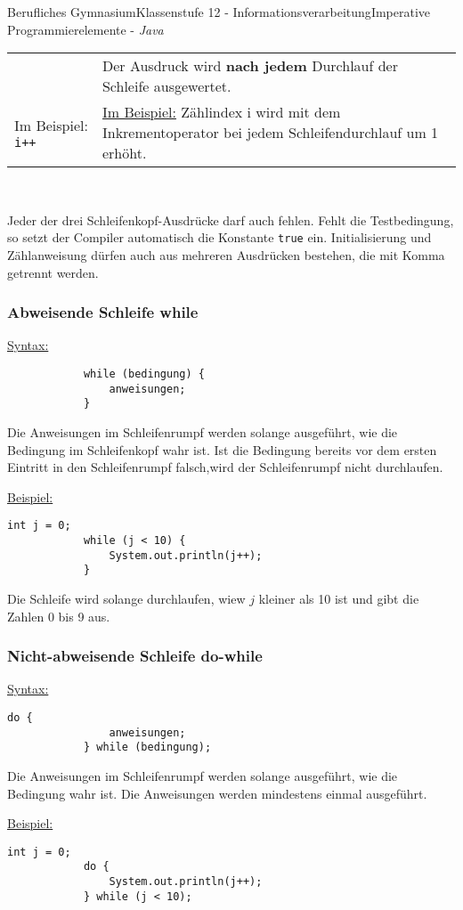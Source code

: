 \documentclass[oneside,openany,headings=optiontotoc,11pt,numbers=noenddot]{article}
\begin{document}
\begin{worksheet}{Berufliches Gymnasium}{Klassenstufe 12 - Informationsverarbeitung}{Imperative Programmierelemente - \textit{Java}}
\begin{tabularx}{\textwidth}{|l|X|}
			& Der Ausdruck wird \textbf{nach jedem} Durchlauf der Schleife ausgewertet.\\
			Im Beispiel: {\lstinline[style=JavaInputStyle]|i++|} & \underline{Im Beispiel:} Zählindex i wird mit dem Inkrementoperator bei jedem Schleifendurchlauf um 1 erhöht.\\
			\hline
		\end{tabularx}\\
		\par\noindent
		Jeder der drei Schleifenkopf-Ausdrücke darf auch fehlen. Fehlt die Testbedingung, so setzt der Compiler automatisch die Konstante \lstinline[style=JavaInputStyle]|true| ein. Initialisierung und Zählanweisung dürfen auch aus mehreren Ausdrücken bestehen, die mit Komma getrennt werden.
		\subsubsection{Abweisende Schleife while}
		\underline{Syntax:}
		\begin{lstlisting}
			while (bedingung) {
				anweisungen;
			}
		\end{lstlisting}
		Die Anweisungen im Schleifenrumpf werden solange ausgeführt, wie die Bedingung im Schleifenkopf wahr ist. Ist die Bedingung bereits vor dem ersten Eintritt in den Schleifenrumpf falsch,wird der Schleifenrumpf nicht durchlaufen.\\
		\par\noindent
		\underline{Beispiel:}
		\begin{lstlisting}[style=JavaInputStyle]
			int j = 0;
			while (j < 10) {
				System.out.println(j++);
			}
		\end{lstlisting}
		Die Schleife wird solange durchlaufen, wiew \(j\) kleiner als 10 ist und gibt die Zahlen 0 bis 9 aus.
		\subsubsection{Nicht-abweisende Schleife do-while}
		\underline{Syntax:}
		\begin{lstlisting}[style=JavaInputStyle]
			do {
				anweisungen;
			} while (bedingung);
		\end{lstlisting}
		Die Anweisungen im Schleifenrumpf werden solange ausgeführt, wie die Bedingung wahr ist. Die Anweisungen werden mindestens einmal ausgeführt.\\
		\par\noindent
		\underline{Beispiel:}
		\begin{lstlisting}[style=JavaInputStyle]
			int j = 0;
			do {
				System.out.println(j++);
			} while (j < 10);
		\end{lstlisting}

\end{worksheet}
\end{document}
